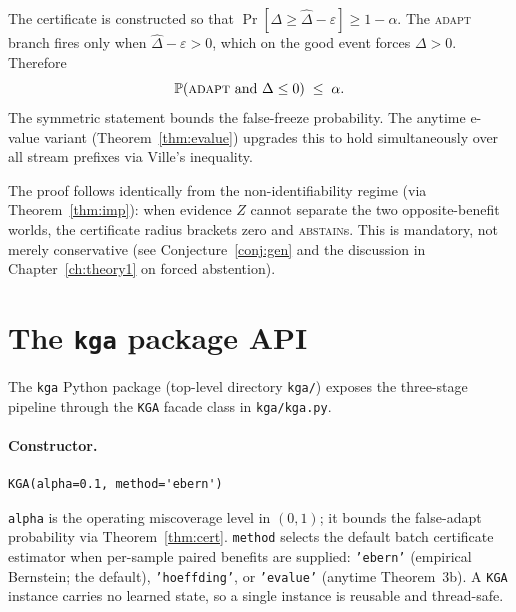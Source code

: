 \begin{theorem}
  \label{thm:kga-false-adapt}
  The certificate is constructed so that $\Pr[\Delta \geq \widehat\Delta -
  \varepsilon] \geq 1 - \alpha$.  The \textsc{adapt} branch fires only when
  $\widehat\Delta - \varepsilon > 0$, which on the good event forces $\Delta >
  0$.  Therefore
  \[
    \Pr\!\left(\text{\textsc{adapt}} \text{ and } \Delta \leq 0\right) \;\leq\;
    \alpha.
  \]
  The symmetric statement bounds the false-freeze probability.  The anytime
  e-value variant (Theorem~\ref{thm:evalue}) upgrades this to hold
  simultaneously over all stream prefixes via Ville's inequality.
\end{theorem}

The proof follows identically from the non-identifiability regime (via
Theorem~\ref{thm:imp}): when evidence $Z$ cannot separate the two opposite-benefit
worlds, the certificate radius brackets zero and \KGA{} \textsc{abstain}s.  This
is mandatory, not merely conservative (see Conjecture~\ref{conj:gen} and the
discussion in Chapter~\ref{ch:theory1} on forced abstention).

\section{The \texttt{kga} package API}
\label{sec:kga-api}

The \texttt{kga} Python package (top-level directory \texttt{kga/}) exposes the
three-stage pipeline through the \texttt{KGA} facade class in \texttt{kga/kga.py}.

\paragraph{Constructor.}

\begin{verbatim}
KGA(alpha=0.1, method='ebern')
\end{verbatim}

\texttt{alpha} is the operating miscoverage level in $(0, 1)$; it bounds the
false-adapt probability via Theorem~\ref{thm:cert}.  \texttt{method} selects the
default batch certificate estimator when per-sample paired benefits are supplied:
\texttt{'ebern'} (empirical Bernstein; the default), \texttt{'hoeffding'}, or
\texttt{'evalue'} (anytime Theorem~3b).  A \texttt{KGA} instance carries no
learned state, so a single instance is reusable and thread-safe.

